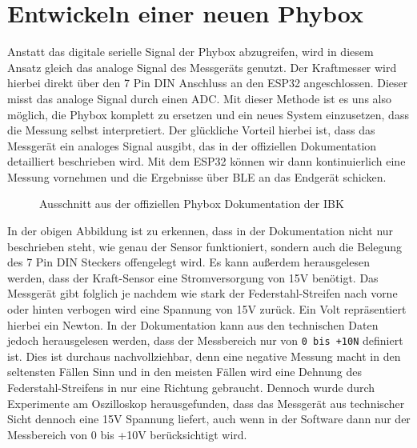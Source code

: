 \section{Entwickeln einer neuen Phybox}
\label{sec:Entwickeln einer neuen Phybox}

\begin{figure}[htb]
    \centering
\end{figure}

Anstatt das digitale serielle Signal der Phybox abzugreifen, wird in diesem Ansatz gleich das analoge Signal des Messgeräts genutzt. Der Kraftmesser wird hierbei direkt über den 7 Pin DIN Anschluss an den \ac{ESP32} angeschlossen. Dieser misst das analoge Signal durch einen \ac{ADC}. Mit dieser Methode ist es uns also möglich, die Phybox komplett zu ersetzen und ein neues System einzusetzen, dass die Messung selbst interpretiert. Der glückliche Vorteil hierbei ist, dass das Messgerät ein analoges Signal ausgibt, das in der offiziellen Dokumentation detailliert beschrieben wird. Mit dem \ac{ESP32} können wir dann kontinuierlich eine Messung vornehmen und die Ergebnisse über \ac{BLE} an das Endgerät schicken.

\clearpage

\begin{figure}[htb]
    \centering
    \caption{Ausschnitt aus der offiziellen Phybox Dokumentation der \ac{IBK}}
\end{figure}

In der obigen Abbildung ist zu erkennen, dass in der Dokumentation nicht nur beschrieben steht, wie genau der Sensor funktioniert, sondern auch die Belegung des 7 Pin DIN Steckers offengelegt wird. Es kann außerdem herausgelesen werden, dass der Kraft-Sensor eine Stromversorgung von \textpm 15V benötigt. Das Messgerät gibt folglich je nachdem wie stark der Federstahl-Streifen nach vorne oder hinten verbogen wird eine Spannung von \textpm 15V zurück. Ein Volt repräsentiert hierbei ein Newton. In der Dokumentation kann aus den technischen Daten jedoch herausgelesen werden, dass der Messbereich nur von \texttt{0 bis +10N} definiert ist. Dies ist durchaus nachvollziehbar, denn eine negative Messung macht in den seltensten Fällen Sinn und in den meisten Fällen wird eine Dehnung des Federstahl-Streifens in nur eine Richtung gebraucht. Dennoch wurde durch Experimente am Oszilloskop herausgefunden, dass das Messgerät aus technischer Sicht dennoch eine \textpm 15V Spannung liefert, auch wenn in der Software dann nur der Messbereich von 0 bis +10V berücksichtigt wird.

